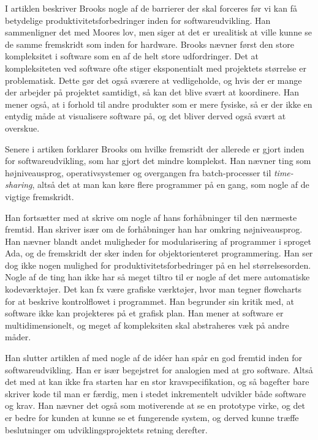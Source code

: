 \documentclass[11pt, a4paper]{article}
\begin{document}
I artiklen \cite{nsbullet} beskriver Brooks nogle af de barrierer der skal forceres før vi kan få betydelige produktivitetsforbedringer inden for softwareudvikling. Han sammenligner det med Moores lov, men siger at det er urealitisk at ville kunne se de samme fremskridt som inden for hardware. Brooks nævner først den store kompleksitet i software som en af de helt store udfordringer. Det at kompleksiteten ved software ofte stiger eksponentialt med projektets størrelse er problematisk. Dette gør det også sværere at vedligeholde, og hvis der er mange der arbejder på projektet samtidigt, så kan det blive svært at koordinere. Han mener også, at i forhold til andre produkter som er mere fysiske, så er der ikke en entydig måde at visualisere software på, og det bliver derved også svært at overskue.

Senere i artiken forklarer Brooks om hvilke fremsridt der allerede er gjort inden for softwareudvikling, som har gjort det mindre komplekst. Han nævner ting som højniveausprog, operativsystemer og overgangen fra batch-processer til \emph{time-sharing}, altså det at man kan køre flere programmer på en gang, som nogle af de vigtige fremskridt.

Han fortsætter med at skrive om nogle af hans forhåbninger til den nærmeste fremtid. Han skriver især om de forhåbninger han har omkring nøjniveausprog. Han nævner blandt andet muligheder for modularisering af programmer i sproget Ada, og de fremskridt der sker inden for objektorienteret programmering. Han ser dog ikke nogen mulighed for produktivitetsforbedringer på en hel størrelsesorden. Nogle af de ting han ikke har så meget tiltro til er nogle af det mere automatiske kodeværktøjer. Det kan fx være grafiske værktøjer, hvor man tegner flowcharts for at beskrive kontrolflowet i programmet. Han begrunder sin kritik med, at software ikke kan projekteres på et grafisk plan. Han mener at software er multidimensionelt, og meget af kompleksiten skal abstraheres væk på andre måder.

Han slutter artiklen af med nogle af de idéer han spår en god fremtid inden for softwareudvikling. Han er især begejstret for analogien med at gro software. Altså det med at kan ikke fra starten har en stor kravspecifikation, og så bagefter bare skriver kode til man er færdig, men i stedet inkrementelt udvikler både software og krav. Han nævner det også som motiverende at se en prototype virke, og det er bedre for kunden at kunne se et fungerende system, og derved kunne træffe beslutninger om udviklingsprojektets retning derefter.
\end{document}
